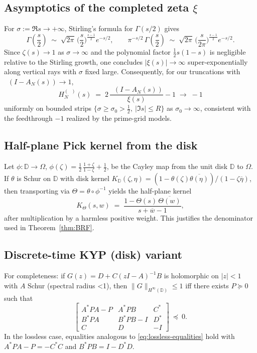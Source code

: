 \documentclass[11pt]{article}
\theoremstyle{definition}
\theoremstyle{remark}
\DeclareMathOperator{\dettwo}{det_2}
\begin{document}
\subsection{Asymptotics of the completed zeta \(\xi\)}\label{app:xi-asymptotics}
For \(\sigma:=\Re s\to+\infty\), Stirling's formula for \(\Gamma(s/2)\) gives
\[
 \Gamma\!\left(\frac{s}{2}\right)\;\sim\;\sqrt{2\pi}\,\Big(\frac{s}{2}\Big)^{\frac{s-1}{2}} e^{-s/2},\qquad \pi^{-s/2}\,\Gamma\!\left(\frac{s}{2}\right)\;\sim\;\sqrt{2\pi}\,\Big(\frac{s}{2\pi}\Big)^{\frac{s-1}{2}} e^{-s/2}.
\]
Since \(\zeta(s)\to 1\) as \(\sigma\to\infty\) and the polynomial factor \(\tfrac12 s(1-s)\) is negligible relative to the Stirling growth, one concludes \(|\xi(s)|\to\infty\) super-exponentially along vertical rays with \(\sigma\) fixed large. Consequently, for our truncations with \(\dettwo(I-A_N(s))\to 1\),
\[
 H_N^{(\dettwo)}(s)\;=\;2\,\frac{\dettwo(I-A_N(s))}{\xi(s)}-1\;\longrightarrow\;-1
\]
uniformly on bounded strips \(\{\sigma\ge \sigma_0>\tfrac12,\ |\Im s|\le R\}\) as \(\sigma_0\to\infty\), consistent with the feedthrough \(-1\) realized by the prime-grid models.

\subsection{Half-plane Pick kernel from the disk}
Let \(\phi:\mathbb D\to\Omega\), \(\phi(\zeta)=\tfrac12\,\frac{1+\zeta}{1-\zeta}+\tfrac12\), be the Cayley map from the unit disk \(\mathbb D\) to \(\Omega\). If \(\theta\) is Schur on \(\mathbb D\) with disk kernel \(K_{\mathbb D}(\zeta,\eta)=(1-\theta(\zeta)\overline{\theta(\eta)})/(1-\zeta\overline{\eta})\), then transporting via \(\Theta=\theta\circ\phi^{-1}\) yields the half-plane kernel
\[
 K_\Theta(s,w)\;=\;\frac{1-\Theta(s)\,\overline{\Theta(w)}}{s+\overline{w}-1},
\]
after multiplication by a harmless positive weight. This justifies the denominator used in Theorem~\ref{thm:BRF}.

\subsection{Discrete-time KYP (disk) variant}
For completeness: if \(G(z)=D+C(zI-A)^{-1}B\) is holomorphic on \(|z|<1\) with \(A\) Schur (spectral radius <1), then \(\|G\|_{H^\infty(\mathbb D)}\le 1\) iff there exists \(P\succeq 0\) such that
\[
 \begin{bmatrix}
  A^*PA-P & A^*PB & C^*\\
  B^*PA & B^*PB-I & D^*\\
  C & D & -I
 \end{bmatrix}\ \preceq\ 0.
\]
In the lossless case, equalities analogous to \eqref{eq:lossless-equalities} hold with \(A^*PA-P=-C^*C\) and \(B^*PB=I-D^*D\).
\end{document}
